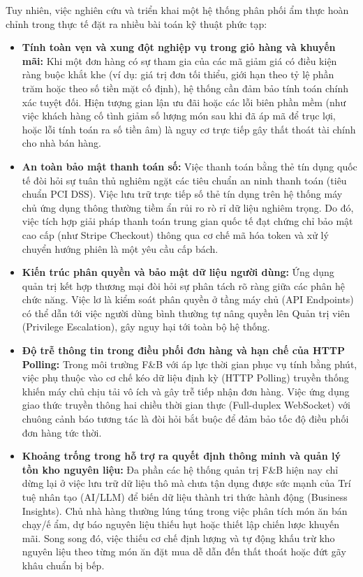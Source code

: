 \documentclass{uetgraduation}
\begin{document}
Tuy nhiên, việc nghiên cứu và triển khai một hệ thống phân phối ẩm thực hoàn chỉnh trong thực tế đặt ra nhiều bài toán kỹ thuật phức tạp:
\begin{itemize}
    \item \textbf{Tính toàn vẹn và xung đột nghiệp vụ trong giỏ hàng và khuyến mãi:} Khi một đơn hàng có sự tham gia của các mã giảm giá có điều kiện ràng buộc khắt khe (ví dụ: giá trị đơn tối thiểu, giới hạn theo tỷ lệ phần trăm hoặc theo số tiền mặt cố định), hệ thống cần đảm bảo tính toán chính xác tuyệt đối. Hiện tượng gian lận ưu đãi hoặc các lỗi biên phần mềm (như việc khách hàng cố tình giảm số lượng món sau khi đã áp mã để trục lợi, hoặc lỗi tính toán ra số tiền âm) là nguy cơ trực tiếp gây thất thoát tài chính cho nhà bán hàng.
    \item \textbf{An toàn bảo mật thanh toán số:} Việc thanh toán bằng thẻ tín dụng quốc tế đòi hỏi sự tuân thủ nghiêm ngặt các tiêu chuẩn an ninh thanh toán (tiêu chuẩn PCI DSS). Việc lưu trữ trực tiếp số thẻ tín dụng trên hệ thống máy chủ ứng dụng thông thường tiềm ẩn rủi ro rò rỉ dữ liệu nghiêm trọng. Do đó, việc tích hợp giải pháp thanh toán trung gian quốc tế đạt chứng chỉ bảo mật cao cấp (như Stripe Checkout) thông qua cơ chế mã hóa token và xử lý chuyển hướng phiên là một yêu cầu cấp bách.
    \item \textbf{Kiến trúc phân quyền và bảo mật dữ liệu người dùng:} Ứng dụng quản trị kết hợp thương mại đòi hỏi sự phân tách rõ ràng giữa các phân hệ chức năng. Việc lơ là kiểm soát phân quyền ở tầng máy chủ (API Endpoints) có thể dẫn tới việc người dùng bình thường tự nâng quyền lên Quản trị viên (Privilege Escalation), gây nguy hại tới toàn bộ hệ thống.
    \item \textbf{Độ trễ thông tin trong điều phối đơn hàng và hạn chế của HTTP Polling:} Trong môi trường F\&B với áp lực thời gian phục vụ tính bằng phút, việc phụ thuộc vào cơ chế kéo dữ liệu định kỳ (HTTP Polling) truyền thống khiến máy chủ chịu tải vô ích và gây trễ tiếp nhận đơn hàng. Việc ứng dụng giao thức truyền thông hai chiều thời gian thực (Full-duplex WebSocket) với chuông cảnh báo tương tác là đòi hỏi bắt buộc để đảm bảo tốc độ điều phối đơn hàng tức thời.
    \item \textbf{Khoảng trống trong hỗ trợ ra quyết định thông minh và quản lý tồn kho nguyên liệu:} Đa phần các hệ thống quản trị F\&B hiện nay chỉ dừng lại ở việc lưu trữ dữ liệu thô mà chưa tận dụng được sức mạnh của Trí tuệ nhân tạo (AI/LLM) để biến dữ liệu thành tri thức hành động (Business Insights). Chủ nhà hàng thường lúng túng trong việc phân tích món ăn bán chạy/ế ẩm, dự báo nguyên liệu thiếu hụt hoặc thiết lập chiến lược khuyến mãi. Song song đó, việc thiếu cơ chế định lượng và tự động khấu trừ kho nguyên liệu theo từng món ăn đặt mua dễ dẫn đến thất thoát hoặc đứt gãy khâu chuẩn bị bếp.
\end{itemize}
\end{document}

